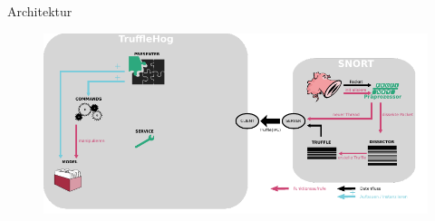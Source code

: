 \begin{frame}{Architektur}
    \begin{figure}
    	\centering
    	\includegraphics[width=\textwidth]{./images/12.pdf}
    \end{figure}
\end{frame}
